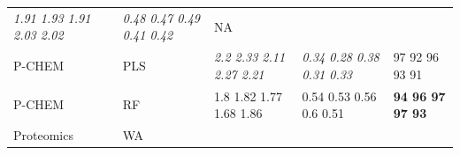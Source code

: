 \documentclass[utf8]{frontiersHLTH} %
\begin{document}
\begin{longtable}[]{@{}lllll@{}}
\begin{minipage}[t]{0.19\columnwidth}
\emph{1.91 1.93 1.91 2.03 2.02}\strut
\end{minipage} & \begin{minipage}[t]{0.19\columnwidth}\raggedright\strut
\emph{0.48 0.47 0.49 0.41 0.42}\strut
\end{minipage} & \begin{minipage}[t]{0.27\columnwidth}\raggedright\strut
NA\strut
\end{minipage}\tabularnewline
\begin{minipage}[t]{0.13\columnwidth}\raggedright\strut
P-CHEM\strut
\end{minipage} & \begin{minipage}[t]{0.08\columnwidth}\raggedright\strut
PLS\strut
\end{minipage} & \begin{minipage}[t]{0.19\columnwidth}\raggedright\strut
\emph{2.2 2.33 2.11 2.27 2.21}\strut
\end{minipage} & \begin{minipage}[t]{0.19\columnwidth}\raggedright\strut
\emph{0.34 0.28 0.38 0.31 0.33}\strut
\end{minipage} & \begin{minipage}[t]{0.27\columnwidth}\raggedright\strut
97 92 96 93 91\strut
\end{minipage}\tabularnewline
\begin{minipage}[t]{0.13\columnwidth}\raggedright\strut
P-CHEM\strut
\end{minipage} & \begin{minipage}[t]{0.08\columnwidth}\raggedright\strut
RF\strut
\end{minipage} & \begin{minipage}[t]{0.19\columnwidth}\raggedright\strut
1.8 1.82 1.77 1.68 1.86\strut
\end{minipage} & \begin{minipage}[t]{0.19\columnwidth}\raggedright\strut
0.54 0.53 0.56 0.6 0.51\strut
\end{minipage} & \begin{minipage}[t]{0.27\columnwidth}\raggedright\strut
\textbf{94 96 97 97 93}\strut
\end{minipage}\tabularnewline
\begin{minipage}[t]{0.13\columnwidth}\raggedright\strut
Proteomics\strut
\end{minipage} & \begin{minipage}[t]{0.08\columnwidth}\raggedright\strut
WA\strut
\end{minipage} & \begin{minipage}[t]{0.19\columnwidth}\raggedright\strut

\end{minipage}
\end{longtable}
\end{document}
